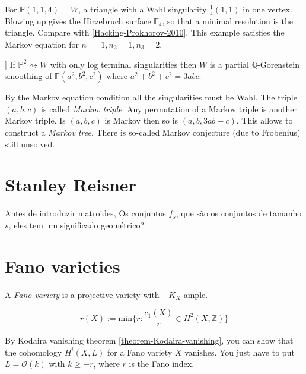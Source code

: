 \begin{example}
\label{example-Hirzebruch-surface}
For $\mathbb{P}(1,1,4)=W$, a triangle with a Wahl singularity
$\frac{1}{4}(1,1)$ in one vertex. Blowing up gives the Hirzebruch surface
$\mathbb{F}_4$, so that a minimal resolution is the triangle. Compare with
[\href{https://arxiv.org/pdf/2504.19929}{Hacking-Prokhorov-2010}]. This example
satisfies the Markov equation for $n_1=1,n_2=1,n_3=2$.
\end{example}

\begin{theorem}[[HP2010]]
\label{theorem-HP2010}
If $\mathbb{P}^2\rightsquigarrow W$ with only log terminal singularities then
$W$ is a partial $\mathbb{Q}$-Gorenstein smoothing of $\mathbb{P}(a^2,b^2,c^2)$
where $a^2+b^2+c^2=3abc$.
\end{theorem}
By the Markov equation condition all the singularities must be Wahl. The triple
$(a,b,c)$ is called {\it Markov triple}. Any permutation of a Markov triple is
another Markov triple. Is $(a,b,c)$ is Markov then so is $(a,b,3ab-c)$. This
allows to construct a {\it Markov tree}. There is so-called Markov conjecture
(due to Frobenius) still unsolved.

\section{Stanley Reisner}
\label{section-}

Antes de introduzir matroides, Os conjuntos $f_s$, que são os conjuntos de
tamanho $s$, eles tem um significado geométrico?



\section{Fano varieties}
\label{section-Fano-varieties}

\begin{definition}
\label{definition-Fano-variety}
A {\it Fano variety} is a projective variety with $-K_X$ ample.
\end{definition}

\begin{definition}
\label{definition-Fano-index}
$$
r(X):=\text{min}\{r:\frac{c_1(X)}{r}\in H^{2}(X,\mathbb{Z})\}
$$
\end{definition}

\begin{exercise}
\label{exercise-Fano-vanishing-higher-cohomology}
By Kodaira vanishing theorem \ref{theorem-Kodaira-vanishing}, 
you can show that the cohomology $H^{i}(X,L)$ for
a Fano variety $X$ vanishes. You just have to put $L=\mathcal{O}(k)$ with $k\geq
-r$, where $r$ is the Fano index.
\end{exercise}

